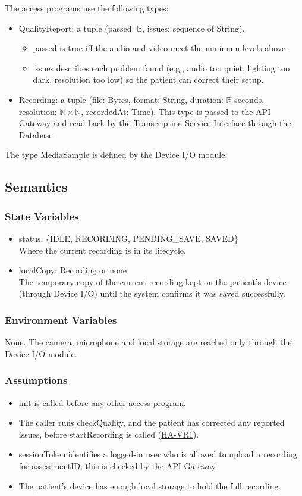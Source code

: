 \documentclass[12pt, titlepage]{article}
\newcommand{\hazref}[1]{\href{https://github.com/Nour-Fawaz/MacaBoca/blob/main/pdfs/HazardAnalysis/HazardAnalysis.pdf}{#1}}
\begin{document}
\noindent The access programs use the following types:
\begin{itemize}
\item QualityReport: a tuple (passed: $\mathbb{B}$, issues: sequence of String).
  \begin{itemize}
  \item passed is true iff the audio and video meet the minimum levels above.
  \item issues describes each problem found (e.g., audio too quiet, lighting too dark, resolution too low) so the patient can correct their setup.
  \end{itemize}
\item Recording: a tuple (file: Bytes, format: String, duration: $\mathbb{R}$ seconds, resolution: $\mathbb{N} \times \mathbb{N}$, recordedAt: Time). This type is passed to the API Gateway and read back by the Transcription Service Interface through the Database.
\end{itemize}
The type MediaSample is defined by the Device I/O module.

\subsection{Semantics}

\subsubsection{State Variables}
\begin{itemize}
\item status: \{IDLE, RECORDING, PENDING\_SAVE, SAVED\}\\
Where the current recording is in its lifecycle.
\item localCopy: Recording or none\\
The temporary copy of the current recording kept on the patient's device (through Device I/O) until the system confirms it was saved successfully.
\end{itemize}

\subsubsection{Environment Variables}
None. The camera, microphone and local storage are reached only through the Device I/O module.

\subsubsection{Assumptions}
\begin{itemize}
\item init is called before any other access program.
\item The caller runs checkQuality, and the patient has corrected any reported issues, before startRecording is called (\hazref{HA-VR1}).
\item sessionToken identifies a logged-in user who is allowed to upload a recording for assessmentID; this is checked by the API Gateway.
\item The patient's device has enough local storage to hold the full recording.
\end{itemize}
\end{document}
